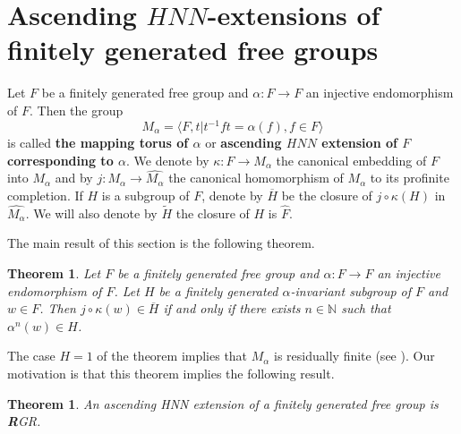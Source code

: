 \documentclass{amsart}
\newtheorem{teo}[lem]{Theorem}
\theoremstyle{definition}
\theoremstyle{remark}
\newcommand{\N}{\mathbb{N}}
\begin{document}
  \section{Ascending $HNN$-extensions of finitely generated free groups}\label{ascending}
  \label{HNN}
  Let $F$ be a finitely generated free group and $\alpha:F\to F$ an injective endomorphism of $F$. Then the group
$$M_\alpha=  \langle F,t |  t^{-1}ft=\alpha (f), f\in F\rangle $$
is called {\bf the mapping torus of $\alpha$} or {\bf ascending $HNN$ extension of $F$ corresponding
to $\alpha$}. We denote by $\kappa:F\to M_\alpha$ the canonical embedding of $F$ into $M_\alpha$ and by $j:M_\alpha\to\widehat{M_\alpha} $ the canonical homomorphism of $M_\alpha$ to its profinite completion.   If $H$ is a subgroup of $F$,  denote by  $\overline H$ be the closure of $j\circ \kappa(H)$ in $\widehat{M_\alpha}$.  We will also denote by $\widetilde H$ the closure of $H$ is $\widehat F$.


 
  The main result of this section is the following theorem.
 \begin{teo}\label{separation}
  Let $F$ be a finitely generated free group and $\alpha:F\to F$ an injective endomorphism of $F$. Let $H$ be a finitely generated  $\alpha$-invariant subgroup of $F$ and $w\in F$. Then $j\circ \kappa(w)\in \overline H$ if and only if there exists $n\in \N$ such that $\alpha^n(w)\in H$.
 \end{teo}
 The case $H=1$ of the theorem implies that $M_\alpha$ is residually finite (see \cite[Lemma 2.1]{BS05}). Our motivation is that this theorem implies the following result.
 \begin{teo}\label{GRHNN} An ascending HNN extension of a finitely generated free group  is {\textbf R}GR.
 \end{teo}
 
\end{document}
